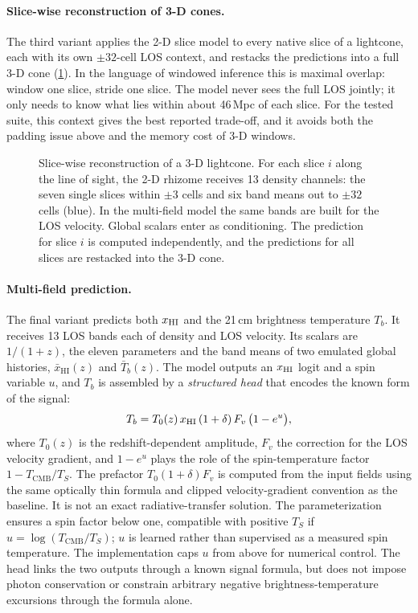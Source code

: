 \paragraph{Slice-wise reconstruction of 3-D cones.} The third variant applies the 2-D slice model to every native slice of a lightcone, each with its own $\pm32$-cell LOS context, and restacks the predictions into a full 3-D cone (\cref{fig:slicewise}). In the language of windowed inference this is maximal overlap: window one slice, stride one slice. The model never sees the full LOS jointly; it only needs to know what lies within about 46\,Mpc of each slice. For the tested suite, this context gives the best reported trade-off, and it avoids both the padding issue above and the memory cost of 3-D windows.

\begin{figure}[!htbp]
  \centering
  \caption{Slice-wise reconstruction of a 3-D lightcone. For each slice $i$ along the line of sight, the 2-D rhizome receives 13 density channels: the seven single slices within $\pm3$ cells and six band means out to $\pm32$ cells (blue). In the multi-field model the same bands are built for the LOS velocity. Global scalars enter as conditioning. The prediction for slice $i$ is computed independently, and the predictions for all slices are restacked into the 3-D cone.}
  \label{fig:slicewise}
\end{figure}

\paragraph{Multi-field prediction.} The final variant predicts both $x_{\mathrm{HI}}$ and the 21\,cm brightness temperature $T_b$. It receives 13 LOS bands each of density and LOS velocity. Its scalars are $1/(1+z)$, the eleven parameters and the band means of two emulated global histories, $\bar x_{\mathrm{HI}}(z)$ and $\bar T_b(z)$. The model outputs an $x_{\mathrm{HI}}$ logit and a spin variable $u$, and $T_b$ is assembled by a \emph{structured head} that encodes the known form of the signal:
\begin{equation}
  \label{eq:structured-head}
  T_b = T_0(z)\,x_{\mathrm{HI}}\,(1+\delta)\,F_v\,\big(1-e^{u}\big),
\end{equation}
where $T_0(z)$ is the redshift-dependent amplitude, $F_v$ the correction for the LOS velocity gradient, and $1-e^{u}$ plays the role of the spin-temperature factor $1-T_{\mathrm{CMB}}/T_S$. The prefactor $T_0(1+\delta)F_v$ is computed from the input fields using the same optically thin formula and clipped velocity-gradient convention as the baseline. It is not an exact radiative-transfer solution. The parameterization ensures a spin factor below one, compatible with positive $T_S$ if $u=\log(T_{\mathrm{CMB}}/T_S)$; $u$ is learned rather than supervised as a measured spin temperature. The implementation caps $u$ from above for numerical control. The head links the two outputs through a known signal formula, but does not impose photon conservation or constrain arbitrary negative brightness-temperature excursions through the formula alone.

